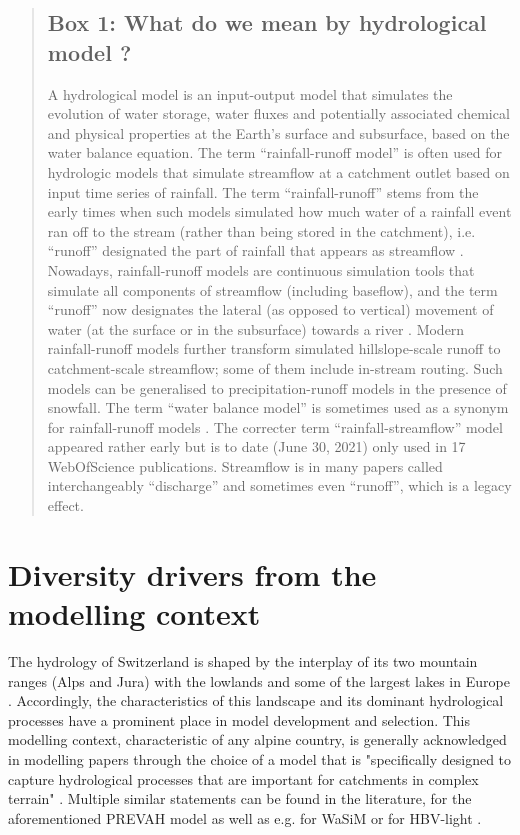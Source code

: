 \documentclass[10pt,a4paper]{article}
\begin{document}
\begin{quote}
\subsection*{Box 1: What do we mean by hydrological model ?}
\label{box:1}

A hydrological model is an input-output model that simulates the evolution of water storage, water fluxes and potentially associated chemical and physical properties at the Earth's surface and subsurface, based on the water balance equation. The term ``rainfall-runoff model'' is often used for hydrologic models that simulate streamflow at a catchment outlet based on input time series of rainfall. The term ``rainfall-runoff'' stems from the early times when such models simulated how much water of a rainfall event ran off to the stream (rather than being stored in the catchment), i.e. ``runoff'' designated the part of rainfall that appears as streamflow \citep{WMO1992}. Nowadays, rainfall-runoff models are continuous simulation tools that simulate all components of streamflow (including baseflow), and the term ``runoff'' now designates the lateral (as opposed to vertical) movement of water (at the surface or in the subsurface) towards a river \citep{WMO2012}. Modern rainfall-runoff models further transform simulated hillslope-scale runoff to catchment-scale streamflow; some of them include in-stream routing. Such models can be generalised to precipitation-runoff models in the presence of snowfall. The term ``water balance model'' is sometimes used as a synonym for rainfall-runoff models \citep{Boughton2004}. The correcter term ``rainfall-streamflow'' model appeared rather early \citep{Young1991} but is to date (June 30, 2021) only used in 17 WebOfScience publications. Streamflow is in many papers called interchangeably ``discharge'' and sometimes even ``runoff'', which is a legacy effect.  \end{quote}


\section{Diversity drivers from the modelling context}
\label{sec:context}

The hydrology of Switzerland is shaped by the interplay of its two mountain ranges (Alps and Jura) with the lowlands and some of the largest lakes in Europe \citep{Michel2020}. Accordingly, the characteristics of this landscape and its dominant hydrological processes have a prominent place in model development and selection. This modelling context, characteristic of any alpine country, is generally acknowledged in modelling papers through the choice of a model that is "specifically designed to capture hydrological processes that are important for catchments in complex terrain" \citep[][refering to the PREVAH model]{Anghileri2019}. Multiple similar statements can be found in the literature, for the aforementioned PREVAH model \citep{Verbunt2007, Zappa2007a, Koplin2010,  Brunner2019e} as well as e.g. for WaSiM \citep{Jasper2002, Jasper2003, Thornton2021} or for HBV-light \citep{SikorskaSenoner2020}. 
\end{document}
